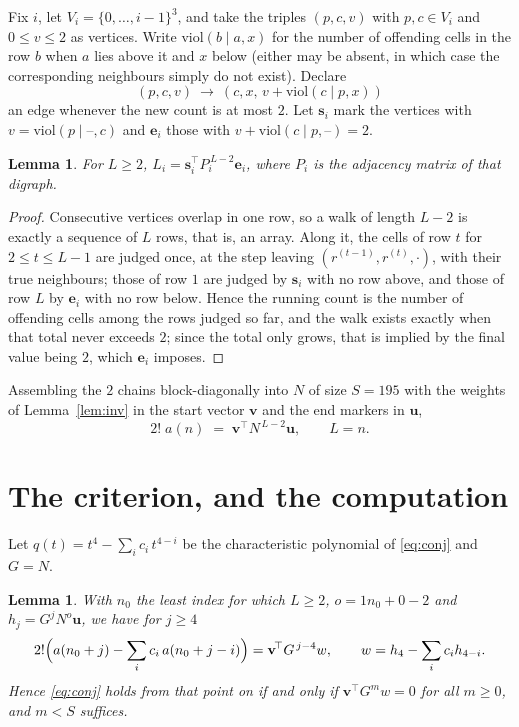 \documentclass[11pt,a4paper]{article}
\theoremstyle{plain}
\newtheorem{lemma}[theorem]{Lemma}
\theoremstyle{definition}
\begin{document}
Fix $i$, let $V_i=\{0,\dots,i-1\}^{3}$, and take the triples $(p,c,v)$ with
$p,c\in V_i$ and $0\le v\le2$ as vertices. Write $\mathrm{viol}(b\mid a,x)$ for the number
of offending cells in the row $b$ when $a$ lies above it and $x$ below (either may be
absent, in which case the corresponding neighbours simply do not exist). Declare
\[
(p,c,v)\ \longrightarrow\ (c,x,\,v+\mathrm{viol}(c\mid p,x))
\]
an edge whenever the new count is at most $2$. Let $\mathbf{s}_i$ mark the vertices with
$v=\mathrm{viol}(p\mid\text{--},c)$ and $\mathbf{e}_i$ those with
$v+\mathrm{viol}(c\mid p,\text{--})=2$.

\begin{lemma}\label{lem:walk}
For $L\ge2$, $L_i=\mathbf{s}_i^{\!\top}P_i^{\,L-2}\mathbf{e}_i$, where $P_i$ is the
adjacency matrix of that digraph.
\end{lemma}

\begin{proof}
Consecutive vertices overlap in one row, so a walk of length $L-2$ is exactly a sequence
of $L$ rows, that is, an array. Along it, the cells of row $t$ for $2\le t\le L-1$ are
judged once, at the step leaving $(r^{(t-1)},r^{(t)},\cdot)$, with their true neighbours;
those of row $1$ are judged by $\mathbf{s}_i$ with no row above, and those of row
$L$ by $\mathbf{e}_i$ with no row below. Hence the running count is the number of
offending cells among the rows judged so far, and the walk exists exactly when that total
never exceeds $2$; since the total only grows, that is implied by the final value being
$2$, which $\mathbf{e}_i$ imposes.
\end{proof}

Assembling the $2$ chains block-diagonally into $N$ of size $S=195$ with the weights of
Lemma~\ref{lem:inv} in the start vector $\mathbf{v}$ and the end markers in
$\mathbf{u}$,
\begin{equation}\label{eq:walk2}
2!\;a(n)\;=\;\mathbf{v}^{\!\top}N^{\,L-2}\mathbf{u},\qquad L=n .
\end{equation}

\section{The criterion, and the computation}

Let $q(t)=t^{4}-\sum_i c_i\,t^{4-i}$ be the characteristic polynomial of
\eqref{eq:conj} and $G=N$.

\begin{lemma}\label{lem:crit}
With $n_0$ the least index for which $L\ge2$, $o=1n_0+0-2$ and
$h_j=G^{j}N^{o}\mathbf{u}$, we have for $j\ge4$
\[
2!\Bigl(a(n_0+j)-\sum_i c_i\,a(n_0+j-i)\Bigr)=\mathbf{v}^{\!\top}G^{\,j-4}w,
\qquad w=h_{4}-\sum_i c_i h_{4-i} .
\]
Hence \eqref{eq:conj} holds from that point on if and only if
$\mathbf{v}^{\!\top}G^{m}w=0$ for all $m\ge0$, and $m<S$ suffices.
\end{lemma}
\end{document}
